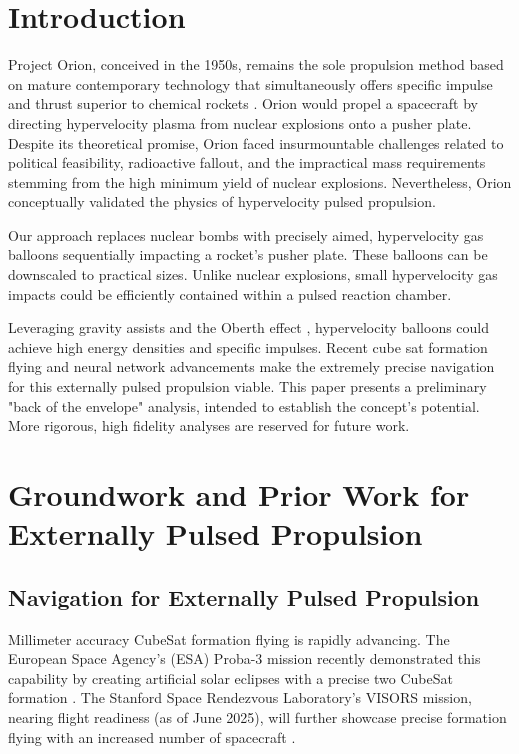 \documentclass{article}
\begin{document}
\section{Introduction}
Project Orion, conceived in the 1950s, remains the sole propulsion method based on mature contemporary technology that simultaneously offers specific impulse and thrust superior to chemical rockets \cite{projorion}. Orion would propel a spacecraft by directing hypervelocity plasma from nuclear explosions onto a pusher plate. Despite its theoretical promise, Orion faced insurmountable challenges related to political feasibility, radioactive fallout, and the impractical mass requirements stemming from the high minimum yield of nuclear explosions. Nevertheless, Orion conceptually validated the physics of hypervelocity pulsed propulsion.

Our approach replaces nuclear bombs with precisely aimed, hypervelocity gas balloons sequentially impacting a rocket's pusher plate. These balloons can be downscaled to practical sizes.  Unlike nuclear explosions, small hypervelocity gas impacts could be efficiently contained within a pulsed reaction chamber.

Leveraging gravity assists and the Oberth effect \cite{oberth_effect}, hypervelocity balloons could achieve high energy densities and specific impulses.  Recent cube sat formation flying and neural network advancements make the extremely precise navigation for this externally pulsed propulsion viable.  This paper presents a preliminary "back of the envelope" analysis, intended to establish the concept's potential. More rigorous, high fidelity analyses are reserved for future work.

\section{Groundwork and Prior Work for Externally Pulsed Propulsion}
\subsection{Navigation for Externally Pulsed Propulsion}
Millimeter accuracy CubeSat formation flying is rapidly advancing. The European Space Agency's (ESA) Proba-3 mission recently demonstrated this capability by creating artificial solar eclipses with a precise two CubeSat formation \cite{esa_proba_3}. The Stanford Space Rendezvous Laboratory's VISORS mission, nearing flight readiness (as of June 2025), will further showcase precise formation flying with an increased number of spacecraft \cite{guffanti2023autonomous}.  
\end{document}
